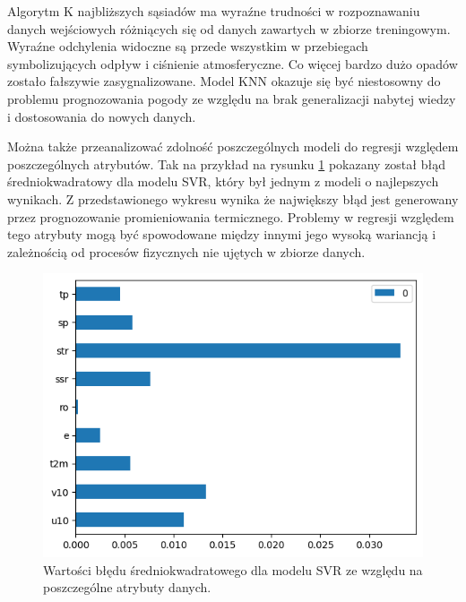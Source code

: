 Algorytm K najbliższych sąsiadów ma wyraźne trudności w rozpoznawaniu danych wejściowych różniących się od 
danych zawartych w zbiorze treningowym. Wyraźne odchylenia widoczne są przede wszystkim w przebiegach  
symbolizujących odpływ i ciśnienie atmosferyczne. Co więcej bardzo dużo opadów zostało fałszywie
zasygnalizowane. Model KNN okazuje się być niestosowny do problemu prognozowania pogody ze względu
na brak generalizacji nabytej wiedzy i dostosowania do nowych danych.

\pagebreak

Można także przeanalizować zdolność poszczególnych modeli do regresji względem poszczególnych atrybutów.
Tak na przykład na rysunku \ref{svr-mse-bar} pokazany został błąd średniokwadratowy dla modelu SVR, który był
jednym z modeli o najlepszych wynikach. Z przedstawionego wykresu wynika że największy błąd jest generowany
przez prognozowanie promieniowania termicznego. Problemy w regresji względem tego atrybuty mogą być  
spowodowane między innymi jego wysoką wariancją i zależnością od procesów fizycznych nie ujętych w zbiorze 
danych.

\begin{figure}[H]
    \centering
    \includegraphics[width=\textwidth]{images/svr_mse_bar.png}
    \caption{Wartości błędu średniokwadratowego dla modelu SVR ze względu na poszczególne atrybuty danych.}
    \label{svr-mse-bar}
\end{figure}

